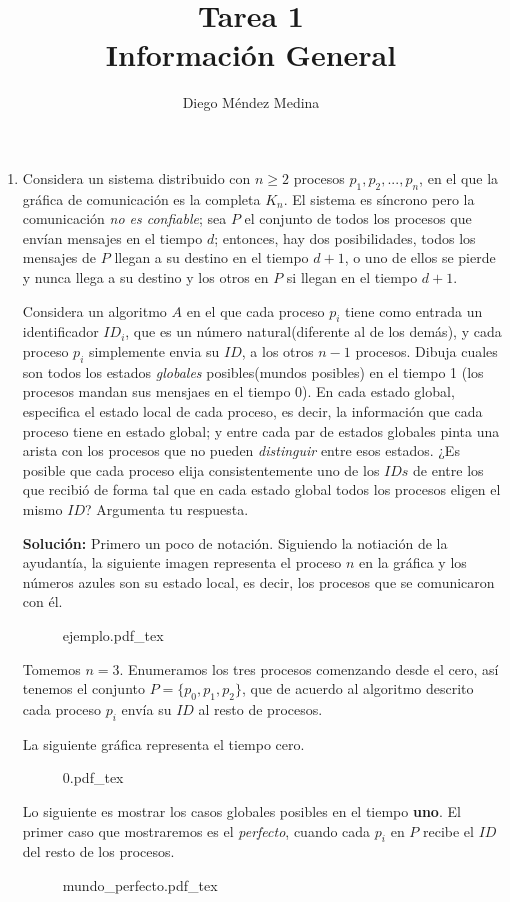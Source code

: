 \documentclass[8pt, letterpaper]{article}
\title{%
  Tarea 1\\
  {\large{Información General}}}
\author{Diego Méndez Medina}
\begin{document}
\ttfamily
\maketitle
\rmfamily
\begin{enumerate}
\item Considera un sistema distribuido con $n \geq 2$ procesos
  $p_1, p_2, ..., p_n$, en el que la gráfica de comunicación es la completa
  $K_n$. El sistema es síncrono pero la comunicación \textit{no es confiable};
  sea $P$ el conjunto de todos los procesos que envían mensajes en el tiempo
  $d$; entonces, hay dos posibilidades, todos los mensajes de $P$ llegan a su
  destino en el tiempo $d+1$, o uno de ellos se pierde y nunca llega a su destino
  y los otros en $P$ si llegan en el tiempo $d+1$.

  Considera un algoritmo $A$ en el que cada proceso $p_i$ tiene como entrada un
  identificador $ID_i$, que es un número natural(diferente al de los demás),
  y cada proceso $p_i$ simplemente envia su $ID$, a los otros $n-1$ procesos.
  Dibuja cuales son todos los estados \textit{globales} posibles(mundos posibles) en el tiempo 1 (los procesos mandan sus mensjaes en el tiempo 0). En cada estado global, especifica el estado local de cada proceso, es decir, la información
  que cada proceso tiene en estado global; y entre cada par de estados globales pinta una arista con los procesos que no pueden \textit{distinguir} entre esos 
  estados. ¿Es posible que cada proceso elija consistentemente uno de los $IDs$
  de entre los que recibió de forma tal que en cada estado global todos los
  procesos eligen el mismo $ID$? Argumenta tu respuesta.
  \ttfamily  

  \hfill\break
  {\bf Solución:}\hfill\break
  Primero un poco de notación. Siguiendo la notiación de la ayudantía, la
  siguiente imagen representa el proceso $n$ en la gráfica y los números azules
  son su estado local, es decir, los procesos que se comunicaron con él.
  \begin{figure}[h]
    \centering
    \def\svgwidth{2cm}
    {ejemplo.pdf_tex}
  \end{figure}
  \hfill\break
  Tomemos $n=3$. Enumeramos los tres procesos comenzando desde el cero,
  así tenemos el conjunto $P=\{p_0, p_1, p_2\}$, que de acuerdo al algoritmo
  descrito cada proceso $p_i$ envía su $ID$ al resto de procesos. 

  La siguiente gráfica representa el tiempo cero.
  \begin{figure}[h]
    \centering
    \def\svgwidth{5cm}
    {0.pdf_tex}
  \end{figure}
  \hfill\break
  Lo siguiente es mostrar los casos globales posibles en el tiempo {\bf uno}.
  El primer caso que mostraremos es el \textit{perfecto}, cuando cada
  $p_i$ en $P$ recibe el $ID$ del resto de los procesos.
  \begin{figure}[h]
    \centering
    \def\svgwidth{5cm}
    {mundo_perfecto.pdf_tex}
  \end{figure}


\end{enumerate}
\end{document}
